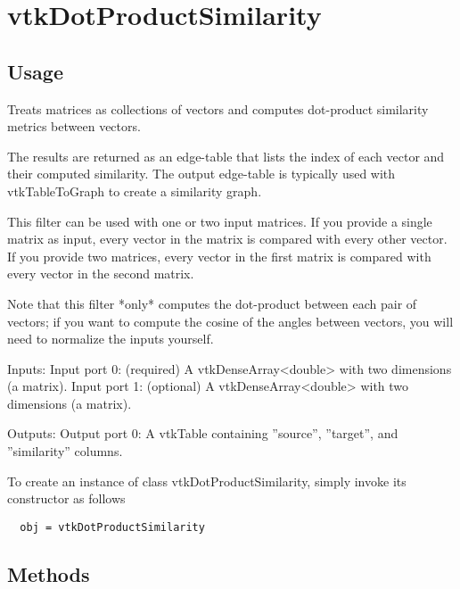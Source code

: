 \section{vtkDotProductSimilarity}

\subsection{Usage}

 Treats matrices as collections of vectors and computes dot-product similarity
 metrics between vectors.

 The results are returned as an edge-table that lists the index of each vector
 and their computed similarity.  The output edge-table is typically used with
 vtkTableToGraph to create a similarity graph.

 This filter can be used with one or two input matrices.  If you provide a single
 matrix as input, every vector in the matrix is compared with every other vector. If
 you provide two matrices, every vector in the first matrix is compared with every
 vector in the second matrix.

 Note that this filter *only* computes the dot-product between each pair of vectors;
 if you want to compute the cosine of the angles between vectors, you will need to
 normalize the inputs yourself.

 Inputs:
   Input port 0: (required) A vtkDenseArray<double> with two dimensions (a matrix).
   Input port 1: (optional) A vtkDenseArray<double> with two dimensions (a matrix).

 Outputs:
   Output port 0: A vtkTable containing ''source'', ''target'', and ''similarity'' columns.


To create an instance of class vtkDotProductSimilarity, simply
invoke its constructor as follows
\begin{verbatim}
  obj = vtkDotProductSimilarity
\end{verbatim}
\subsection{Methods}

